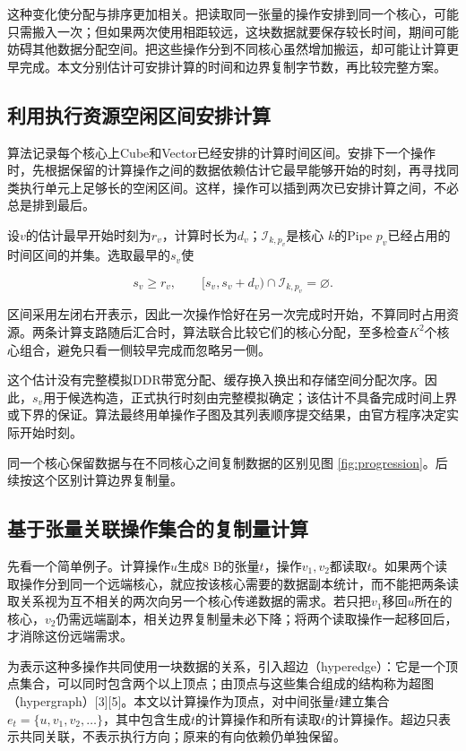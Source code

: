 \documentclass[anonymous,notoc]{gmcm2026}
\begin{document}
这种变化使分配与排序更加相关。把读取同一张量的操作安排到同一个核心，可能只需搬入一次；但如果两次使用相距较远，这块数据就要保存较长时间，期间可能妨碍其他数据分配空间。把这些操作分到不同核心虽然增加搬运，却可能让计算更早完成。本文分别估计可安排计算的时间和边界复制字节数，再比较完整方案。

\subsection{利用执行资源空闲区间安排计算}

算法记录每个核心上Cube和Vector已经安排的计算时间区间。安排下一个操作时，先根据保留的计算操作之间的数据依赖估计它最早能够开始的时刻，再寻找同类执行单元上足够长的空闲区间。这样，操作可以插到两次已安排计算之间，不必总是排到最后。

设\(v\)的估计最早开始时刻为\(r_v\)，计算时长为\(d_v\)；\(\mathcal I_{k,p_v}\)是核心 \(k\)的Pipe \(p_v\)已经占用的时间区间的并集。选取最早的\(s_v\)使

\[s_v\ge r_v,\qquad [s_v,s_v+d_v)\cap\mathcal I_{k,p_v}=\varnothing.\]

区间采用左闭右开表示，因此一次操作恰好在另一次完成时开始，不算同时占用资源。两条计算支路随后汇合时，算法联合比较它们的核心分配，至多检查\(K^2\)个核心组合，避免只看一侧较早完成而忽略另一侧。

这个估计没有完整模拟DDR带宽分配、缓存换入换出和存储空间分配次序。因此，\(s_v\)用于候选构造，正式执行时刻由完整模拟确定；该估计不具备完成时间上界或下界的保证。算法最终用单操作子图及其列表顺序提交结果，由官方程序决定实际开始时刻。

同一个核心保留数据与在不同核心之间复制数据的区别见图 \ref{fig:progression}。后续按这个区别计算边界复制量。

\subsection{基于张量关联操作集合的复制量计算}

先看一个简单例子。计算操作\(u\)生成8 B的张量\(t\)，操作\(v_1,v_2\)都读取\(t\)。如果两个读取操作分到同一个远端核心，就应按该核心需要的数据副本统计，而不能把两条读取关系视为互不相关的两次向另一个核心传递数据的需求。若只把\(v_1\)移回\(u\)所在的核心，\(v_2\)仍需远端副本，相关边界复制量未必下降；将两个读取操作一起移回后，才消除这份远端需求。

为表示这种多操作共同使用一块数据的关系，引入超边（hyperedge）：它是一个顶点集合，可以同时包含两个以上顶点；由顶点与这些集合组成的结构称为超图（hypergraph）{[}3{]}{[}5{]}。本文以计算操作为顶点，对中间张量\(t\)建立集合\(e_t=\{u,v_1,v_2,\ldots\}\)，其中包含生成\(t\)的计算操作和所有读取\(t\)的计算操作。超边只表示共同关联，不表示执行方向；原来的有向依赖仍单独保留。
\end{document}
